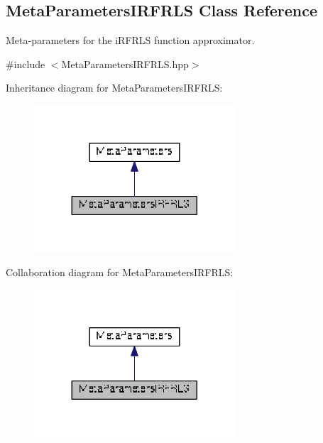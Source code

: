\hypertarget{classDmpBbo_1_1MetaParametersIRFRLS}{\subsection{Meta\+Parameters\+I\+R\+F\+R\+L\+S Class Reference}
\label{classDmpBbo_1_1MetaParametersIRFRLS}
}


Meta-\/parameters for the i\+R\+F\+R\+L\+S function approximator.  




{\ttfamily \#include $<$Meta\+Parameters\+I\+R\+F\+R\+L\+S.\+hpp$>$}



Inheritance diagram for Meta\+Parameters\+I\+R\+F\+R\+L\+S\+:
\nopagebreak
\begin{figure}[H]
\begin{center}
\leavevmode
\includegraphics[width=212pt]{classDmpBbo_1_1MetaParametersIRFRLS__inherit__graph}
\end{center}
\end{figure}


Collaboration diagram for Meta\+Parameters\+I\+R\+F\+R\+L\+S\+:
\nopagebreak
\begin{figure}[H]
\begin{center}
\leavevmode
\includegraphics[width=212pt]{classDmpBbo_1_1MetaParametersIRFRLS__coll__graph}
\end{center}
\end{figure}
